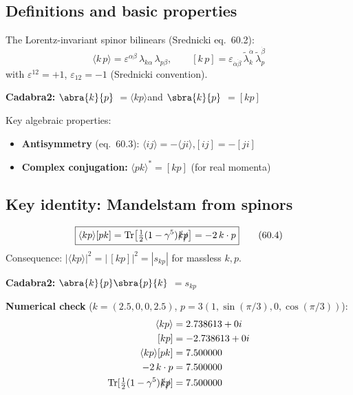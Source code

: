 \documentclass[12pt]{article}
\newcommand{\cdbexpr}[1]{\textcolor{cadblue}{$#1$}}
\begin{document}
\subsection{Definitions and basic properties}

The Lorentz-invariant spinor bilinears (Srednicki eq.~60.2):
\begin{equation}
  \langle k\,p\rangle = \varepsilon^{\alpha\beta}\,\lambda_{k\alpha}\,\lambda_{p\beta},
  \qquad
  [k\,p] = \varepsilon_{\dot\alpha\dot\beta}\,\tilde\lambda_k^{\dot\alpha}\,\tilde\lambda_p^{\dot\beta}
  \tag{60.2}
\end{equation}
with $\varepsilon^{12}=+1$, $\varepsilon_{12}=-1$ (Srednicki convention).

\textbf{Cadabra2:}\quad
\cdbexpr{\abra{k}{p}} $= \langle kp\rangle$\quad and\quad
\cdbexpr{\sbra{k}{p}} $= [kp]$

\medskip
Key algebraic properties:
\begin{itemize}
  \item \textbf{Antisymmetry} (eq.~60.3): $\langle ij\rangle = -\langle ji\rangle$,\quad $[ij]=-[ji]$
  \item \textbf{Complex conjugation:} $\langle pk\rangle^* = [kp]$ (for real momenta)
\end{itemize}

\subsection{Key identity: Mandelstam from spinors}

\begin{equation}
  \boxed{
    \langle kp\rangle[pk]
    = \mathrm{Tr}\bigl[\tfrac12(1-\gamma^5)\slashed{k}\slashed{p}\bigr]
    = -2\,k\cdot p
  }
  \tag{60.4}
\end{equation}
Consequence: $|\langle kp\rangle|^2 = |\,[kp]|^2 = |s_{kp}|$ for massless $k,p$.

\textbf{Cadabra2:} \cdbexpr{\abra{k}{p}\sbra{p}{k}} $= s_{kp}$

\textbf{Numerical check} ($k=(2.5,0,0,2.5)$, $p=3(1,\sin(\pi/3),0,\cos(\pi/3))$):
\begin{align*}
  \langle kp\rangle &= 2.738613 + 0i \\
  [kp] &= -2.738613 + 0i \\
  \langle kp\rangle[pk] &= 7.500000 \\
  -2\,k\cdot p &= 7.500000 \\
  \mathrm{Tr}[\tfrac12(1-\gamma^5)\slashed{k}\slashed{p}] &= 7.500000
\end{align*}
\end{document}
